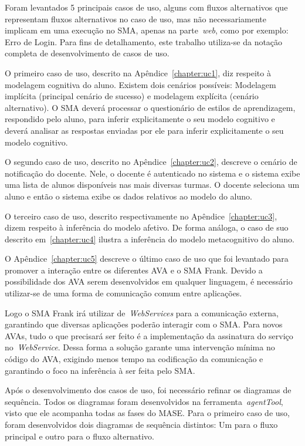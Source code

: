 Foram levantados 5 principais casos de uso, alguns com fluxos alternativos que representam fluxos alternativos no caso de uso, mas não necessariamente implicam em uma execução no SMA, apenas na parte~\emph{web}, como por exemplo: Erro de Login. Para fins de detalhamento, este trabalho utiliza-se da notação completa de desenvolvimento de casos de uso.

O primeiro caso de uso, descrito na Apêndice~\ref{chapter:uc1}, diz respeito à modelagem cognitiva do aluno. Existem dois cenários possíveis: Modelagem implícita (principal cenário de sucesso) e modelagem explícita (cenário alternativo). O SMA deverá processar o questionário de estilos de aprendizagem, respondido pelo aluno, para inferir explicitamente o seu modelo cognitivo e deverá analisar as respostas enviadas por ele para inferir explicitamente o seu modelo cognitivo.

O segundo caso de uso, descrito no Apêndice~\ref{chapter:uc2}, descreve o cenário de notificação do docente. Nele, o docente é autenticado no sistema e o sistema exibe uma lista de alunos disponíveis nas mais diversas turmas. O docente seleciona um aluno e então o sistema exibe os dados relativos ao modelo do aluno.

O terceiro caso de uso, descrito respectivamente no Apêndice~\ref{chapter:uc3}, dizem respeito à inferência do modelo afetivo. De forma análoga, o caso de suo descrito em~\ref{chapter:uc4} ilustra a inferência do modelo metacognitivo do aluno.

O Apêndice~\ref{chapter:uc5} descreve o último caso de uso que foi levantado para promover a interação entre os diferentes AVA e o SMA Frank. Devido a possibilidade dos AVA serem desenvolvidos em qualquer linguagem, é necessário utilizar-se de uma forma de comunicação comum entre aplicações.

Logo o SMA Frank irá utilizar de~\emph{WebServices} para a comunicação externa, garantindo que diversas aplicações poderão interagir com o SMA. Para novos AVAs, tudo o que precisará ser feito é a implementação da assinatura do serviço no~\emph{WebService}. Dessa forma a solução garante uma intervenção mínima no código do AVA, exigindo menos tempo na codificação da comunicação e garantindo o foco na inferência à ser feita pelo SMA.

Após o desenvolvimento dos casos de uso, foi necessário refinar os diagramas de sequência. Todos os diagramas foram desenvolvidos na ferramenta~\emph{agentTool}, visto que ele acompanha todas as fases do MASE. Para o primeiro caso de uso, foram desenvolvidos dois diagramas de sequência distintos: Um para o fluxo principal e outro para o fluxo alternativo.

